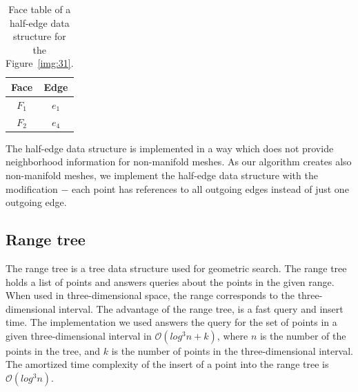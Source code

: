 \begin{table}[h!]
    \centering
    \begin{tabular}{|c|c|}
    \hline
    \hline
    Face  & Edge            \\ \hline\hline
    $F_1$ & $e_1$           \\ \hline
    $F_2$ & $e_4$           \\ \hline\hline
    \end{tabular}
\caption{Face table of a half-edge data structure for the Figure~\ref{img:31}.}
\label{tab:7}
\end{table}

The half-edge data structure is implemented in a way which does not provide 
neighborhood information for non-manifold meshes.
As our algorithm creates also non-manifold meshes, we implement the half-edge data
structure with the modification $-$ each point has references to all outgoing edges
instead of just one outgoing edge. 

\subsection{Range tree}
The range tree is a tree data structure used for geometric search.
The range tree holds a list of points and answers queries about
the points in the given range. When used in three-dimensional space, 
the range corresponds to the three-dimensional interval.
The advantage of the range tree, is a fast query and insert
time. The implementation we used \cite{rangetree} answers the query for 
the set of points in a given three-dimensional
interval in $\mathcal{O}(log^3n+k)$, where $n$ is the number of
the points in the tree, and $k$ is the number of points in the three-dimensional
interval. The amortized time complexity of the insert of a point into the 
range tree is $\mathcal{O}(log^3n)$.

